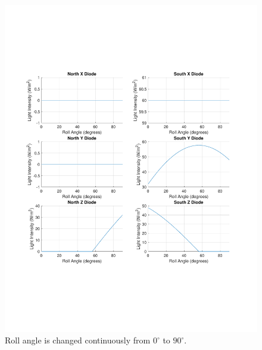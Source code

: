 \documentclass[10pt, letterpaper]{article}
\begin{document}
\begin{figure}[H]
	\centering
	\includegraphics[scale=0.8]{RollAngle_DiodeResponse.pdf}
    \caption{Roll angle is changed continuously from $0^{\circ}$ to $90^{\circ}$.}
    \label{fig:RollAngleChange}
\end{figure}
\end{document}
